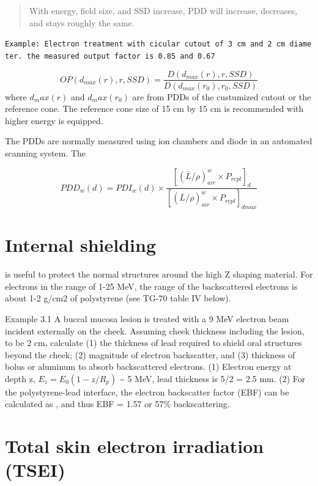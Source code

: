 \documentclass[]{book}
\theoremstyle{definition}
\theoremstyle{definition}
\theoremstyle{definition}
\theoremstyle{remark}
\begin{document}
\begin{quote}
With energy, field size, and SSD increase, PDD will increase, decreases,
and stays roughly the same.
\end{quote}

\texttt{Example:\ Electron\ treatment\ with\ cicular\ cutout\ of\ 3\ cm\ and\ 2\ cm\ diameter.\ the\ measured\ output\ factor\ is\ 0.85\ and\ 0.67}

\[
OP\left(d_{max}(r), r, SSD\right) = \frac{D\left(d_{max}(r), r, SSD\right)}{D\left(d_{max}(r_0), r_0, SSD\right)}
\] where \(d_max(r)\) and \(d_max(r_0)\) are from PDDs of the custumized
cutout or the reference cone. The reference cone size of 15 cm by 15 cm
is recommended with higher energy is equipped.

The PDDs are normally measured using ion chambers and diode in an
automated scanning system. The

\[
PDD_w(d)=PDI_w(d)\times\frac{\left[(\overline{L}/\rho)^{w}_{air}\times P_{repl}\right]_d}{\left[(\overline{L}/\rho)^{w}_{air}\times P_{repl}\right]_{dmax}}
\]

\section{Internal shielding}\label{internal-shielding}

is useful to protect the normal structures around the high Z shaping
material. For electrons in the range of 1-25 MeV, the range of the
backscattered electrons is about 1-2 g/cm2 of polystyrene (see TG-70
table IV below).

Example 3.1 A buccal mucosa lesion is treated with a 9 MeV electron beam
incident externally on the cheek. Assuming cheek thickness including the
lesion, to be 2 cm, calculate (1) the thickness of lead required to
shield oral structures beyond the cheek; (2) magnitude of electron
backscatter, and (3) thickness of bolus or aluminum to absorb
backscattered electrons. (1) Electron energy at depth z,
\(E_z = E_0(1 - z/R_p)\) \textasciitilde{} 5 MeV, lead thickness is 5/2
= 2.5 mm. (2) For the polystyrene-lead interface, the electron
backscatter factor (EBF) can be calculated as , and thus EBF = 1.57 or
57\% backscattering.

\section{Total skin electron irradiation
(TSEI)}\label{total-skin-electron-irradiation-tsei}
\end{document}

